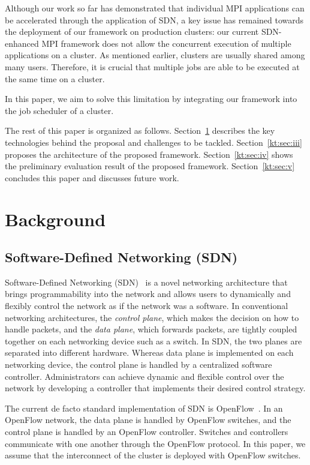 \documentclass[graybox]{svmult}
\begin{document}
Although our work so far has demonstrated that individual MPI applications can
be accelerated through the application of SDN, a key issue has remained
towards the deployment of our framework on production clusters: our current
SDN-enhanced MPI framework does not allow the concurrent execution of multiple
applications on a cluster. As mentioned earlier, clusters are usually shared
among many users. Therefore, it is crucial that multiple jobs are able to be
executed at the same time on a cluster.

In this paper, we aim to solve this limitation by integrating our framework
into the job scheduler of a cluster.

The rest of this paper is organized as follows. Section~\ref{kt:sec:ii}
describes the key technologies behind the proposal and challenges to be tackled.
Section~\ref{kt:sec:iii} proposes the architecture of the proposed framework.
Section~\ref{kt:sec:iv} shows the preliminary evaluation result of the
proposed framework. Section~\ref{kt:sec:v} concludes this paper and discusses
future work.

\section{Background}\label{kt:sec:ii}

\subsection{Software-Defined Networking (SDN)}

Software-Defined Networking (SDN)~\cite{Jamalian2015} is a novel networking
architecture that brings programmability into the network and allows users to
dynamically and flexibly control the network as if the network was a software.
In conventional networking architectures, the \textit{control plane}, which
makes the decision on how to handle packets, and the \textit {data plane},
which forwards packets, are tightly coupled together on each networking device
such as a switch. In SDN, the two planes are separated into different
hardware. Whereas data plane is implemented on each networking device, the
control plane is handled by a centralized software controller. Administrators
can achieve dynamic and flexible control over the network by developing a
controller that implements their desired control strategy.

The current de facto standard implementation of SDN is
OpenFlow~\cite{McKeown2008}. In an OpenFlow network, the data plane is handled
by OpenFlow switches, and the control plane is handled by an OpenFlow
controller. Switches and controllers communicate with one another through the
OpenFlow protocol. In this paper, we assume that the interconnect of the
cluster is deployed with OpenFlow switches.
\end{document}
